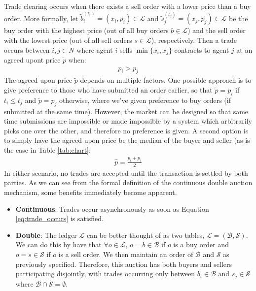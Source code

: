 Trade clearing occurs when there exists a sell order with a lower price than a buy order. More formally, let $\tilde{b}^{(t_i)}_i = (x_i,p_i) \in \mathcal{L}$ and $\tilde{s}^{(t_j)}_j = (x_j,p_j) \in \mathcal{L}$ be the buy order with the highest price (out of all buy orders $b \in \mathcal{L}$) and the sell order with the lowest price (out of all sell orders $s \in \mathcal{L}$), respectively. Then a trade occurs between $i,j \in N$ where agent $i$ sells $\min\{x_i,x_j \}$ contracts to agent $j$ at an agreed upont price $\tilde{p}$ when:
\begin{align}
p_i > p_j 
\label{eq:trade_occurs}
\end{align}
The agreed upon price $\tilde{p}$ depends on multiple factors. One possible approach is to give preference to those who have submitted an order earlier, so that $\tilde{p} = p_i$ if $t_i \leq t_j$ and $\tilde{p} = p_j$ otherwise, where we've given preference to buy orders (if submitted at the same time). However, the market can be designed so that same time submissions are impossible or made impossible by a system which arbitrarily picks one over the other, and therefore no preference is given. A second option is to simply have the agreed upon price be the median of the buyer and seller (as is the case in Table \ref{tab:chart}:
\begin{align}
\hat{p} = \frac{p_i + p_j}{2}
\end{align}
In either scenario, no trades are accepted until the transaction is settled by both parties. As we can see from the formal definition of the continuous double auction mechanism, some benefits immediately become apparent.
\begin{itemize}
\item \textbf{Continuous}: Trades occur asynchronously as soon as Equation \ref{eq:trade_occurs} is satisfied.
\item \textbf{Double}: The ledger $\mathcal{L}$ can be better thought of as two tables, $\mathcal{L} = (\mathcal{B}, \mathcal{S})$. We can do this by have that $\forall o \in \mathcal{L}$, $o = b \in \mathcal{B}$ if $o$ is a buy order and $o = s \in \mathcal{S}$ if $o$ is a sell order. We then maintain an order of $\mathcal{B}$ and $\mathcal{S}$ as previously specified. Therefore, this auction has both buyers and sellers participating disjointly, with trades occurring only between $b_i \in \mathcal{B}$ and $s_j \in \mathcal{S}$ where $\mathcal{B} \cap \mathcal{S} = \emptyset$. 
\end{itemize}

